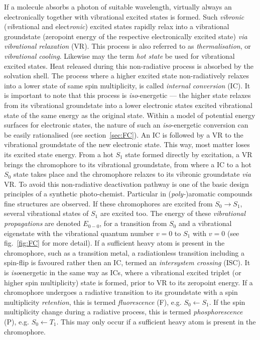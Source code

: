 		If a molecule absorbs a photon of suitable wavelength, virtually always an electronically together with vibrational excited states is formed. Such \emph{vibronic} (\emph{vibr}ational and elect\emph{ronic}) excited states rapidly relax into a vibrational groundstate (zeropoint energy of the respective electronically excited state) \textit{via} \emph{vibrational relaxation} (VR). This process is also referred to as \emph{thermalisation}, or \emph{vibrational cooling}. Likewise may the term \emph{hot state} be used for vibrational excited states. Heat released during this non-radiative process is absorbed by the solvation shell. The process where a higher excited state non-radiatively relaxes into a lower state of same spin multiplicity, is called \emph{internal conversion} (IC). It is important to note that this process is \textit{iso}-energetic --- the higher state relaxes from its vibrational groundstate into a lower electronic states excited vibrational state of the same energy as the original state. Within a model of potential energy surfaces for electronic states, the nature of such an \textit{iso}-energetic conversion can be easily rationalised (see section~\ref{sec:FC}). An IC is followed by a VR to the vibrational groundstate of the new electronic state. This way, most matter loses its excited state energy. From a hot $S_1$ state formed directly by excitation, a VR brings the chromophore to its vibrational groundstate, from where a IC to a hot $S_0$ state takes place and the chromophore relaxes to its vibronic groundstate \textit{via} VR. To avoid this non-radiative deactivation pathway is one of the basic design principles of a synthetic photo-chemist. Particular in (\textit{poly-})aromatic compounds fine structures are observed. If these chromophores are excited from $S_0 \to S_1$, several vibrational states of $S_1$ are excited too. The energy of these \emph{vibrational propagations} are denoted $E_{0-0}$, for a transition from $S_0$ and a vibrational eigenstate with the vibrational quantum number $v = 0$ to $S_1$ with $v = 0$ (see fig.~\ref{fig:FC} for more detail). If a sufficient heavy atom is present in the chromophore, such as a transition metal, a radiationless transition including a spin-flip is favoured rather then an IC, termed an \emph{intersystem crossing} (ISC). It is \textit{iso}energetic in the same way as ICs, where a vibrational excited triplet (or higher spin multiplicity) state is formed, prior to VR to its zeropoint energy. If a chromophore undergoes a radiative transition to its groundstate with a spin multiplicity \emph{retention}, this is termed \emph{fluorescence} (F), e.g. $S_0 \gets S_1$. If the spin multiplicity change during a radiative process, this is termed \emph{phosphorescence} (P), e.g. $S_0 \gets T_1$. This may only occur if a sufficient heavy atom is present in the chromophore.

